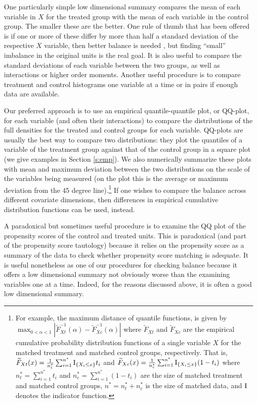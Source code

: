 \documentclass[11pt,titlepage]{article}
\begin{document}
One particularly simple low dimensional summary compares the mean of
each variable in $X$ for the treated group with the mean of each
variable in the control group.  The smaller these are the better.  One
rule of thumb that has been offered is if one or more of these differ
by more than half a standard deviation of the respective $X$ variable,
then better balance is needed \citep{Cochran68}, but finding ``small''
imbalance in the original units is the real goal.  It is also useful
to compare the standard deviations of each variable between the two
groups, as well as interactions or higher order moments.  Another
useful procedure is to compare treatment and control histograms one
variable at a time or in pairs if enough data are available.

Our preferred approach is to use an empirical quantile-quantile plot,
or QQ-plot, for each variable (and often their interactions) to
compare the distributions of the full densities for the treated and
control groups for each variable.  QQ-plots are usually the best way
to compare two distributions: they plot the quantiles of a variable of
the treatment group against that of the control group in a square plot
(we give examples in Section \ref{s:emp}).  We also numerically
summarize these plots with mean and maximum deviation between the two
distributions on the scale of the variables being measured (on the
plot this is the average or maximum deviation from the 45 degree
line).\footnote{For example, the maximum distance of quantile
  functions, is given by $\max_{0 < \alpha < 1}
  |\widetilde{F}_{Xt}^{-1}(\alpha)-\widetilde{F}^{-1}_{Xc}(\alpha)|$
  where $\widetilde{F}_{Xt}$ and $\widetilde{F}_{Xc}$ are the
  empirical cumulative probability distribution functions of a single
  variable $X$ for the matched treatment and matched control groups,
  respectively. That is, $\widetilde{F}_{Xt}(x)=\frac{1}{n^*_t}
  \sum_{i=1}^{n^*} {\rm I}_{\{X_i \le x\}} t_i$ and
  $\widetilde{F}_{Xc}(x)=\frac{1}{n^*_c} \sum_{i=1}^{n^*} {\rm
    I}_{\{X_i \le x\}} (1-t_i)$ where $n^*_t=\sum_{i=1}^{n^*} t_i$ and
  $n^*_c=\sum_{i=1}^{n^*} (1-t_i)$ are the size of matched treatment
  and matched control groups, $n^*=n^*_t + n^*_c$ is the size of
  matched data, and ${\rm I}$ denotes the indicator function.} If one
wishes to compare the balance across different covariate dimensions,
then differences in empirical cumulative distribution functions can be
used, instead.

A paradoxical but sometimes useful procedure is to examine the QQ plot
of the propensity scores of the control and treated units.  This is
paradoxical (and part of the propensity score tautology) because it
relies on the propensity score as a summary of the data to check
whether propensity score matching is adequate.  It is useful
nonetheless as one of our procedures for checking balance because it
offers a low dimensional summary not obviously worse than the
examining variables one at a time.  Indeed, for the reasons discussed
above, it is often a good low dimensional summary.
\end{document}
